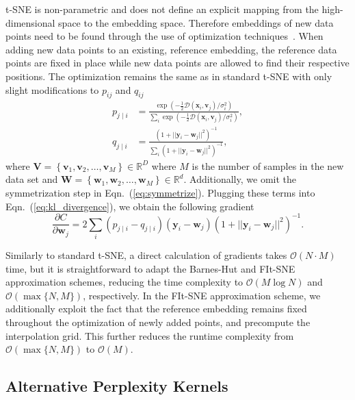 \documentclass[letter]{article}
\begin{document}
t-SNE is non-parametric and does not define an explicit mapping from the
high-dimensional space to the embedding space. Therefore embeddings of new data
points need to be found through the use of optimization
techniques~\cite{policar2019embedding}. When adding new data points to an
existing, reference embedding, the reference data points are fixed in place
while new data points are allowed to find their respective positions. The
optimization remains the same as in standard t-SNE with only slight
modifications to $p_{ij}$ and $q_{ij}$
\begin{align}
p_{j \mid i} &= \frac{\exp \left ( -\frac{1}{2} \mathcal{D}(\mathbf{x}_i, \mathbf{v}_j) /  \sigma_i^2 \right )}{\sum_{i} \exp \left ( -\frac{1}{2} \mathcal{D}(\mathbf{x}_i, \mathbf{v}_j) / \sigma_i^2 \right )}, \\
q_{j \mid i} &= \frac{\left ( 1 + || \mathbf{y}_i - \mathbf{w}_j ||^2 \right )^{-1}}{\sum_{i}\left ( 1 + || \mathbf{y}_i - \mathbf{w}_j ||^2 \right )^{-1}},
\end{align}
\noindent where $\mathbf{V} = \left \{ \mathbf{v}_1, \mathbf{v}_2, \dots,
\mathbf{v}_M \right \} \in \mathbb{R}^D$ where $M$ is the number of samples in
the new data set and $\mathbf{W} = \left \{ \mathbf{w}_1, \mathbf{w}_2, \dots,
\mathbf{w}_M \right \} \in \mathbb{R}^d$. Additionally, we omit the
symmetrization step in Eqn.~(\ref{eq:symmetrize}). Plugging these terms into
Eqn.~(\ref{eq:kl_divergence}), we obtain the following gradient
\begin{equation}
\frac{\partial C}{\partial \mathbf{w}_j} = 2 \sum_i \left ( p_{j \mid i} - q_{j \mid i} \right ) \left ( \mathbf{y}_i - \mathbf{w}_j \right ) \left ( 1 + || \mathbf{y}_i - \mathbf{w}_j || ^2 \right )^{-1}.
\label{eq:gradient}
\end{equation}

Similarly to standard t-SNE, a direct calculation of gradients takes
$\mathcal{O}(N \cdot M)$ time, but it is straightforward to adapt the Barnes-Hut
and FIt-SNE approximation schemes, reducing the time complexity to
$\mathcal{O}(M \log N)$ and $\mathcal{O}(\max \{ N, M \})$, respectively. In the
FIt-SNE approximation scheme, we additionally exploit the fact that the
reference embedding remains fixed throughout the optimization of newly added
points, and precompute the interpolation grid. This further reduces the runtime
complexity from $\mathcal{O}(\max \{ N, M \})$ to $\mathcal{O}(M)$.

\subsection*{Alternative Perplexity Kernels}
\end{document}
